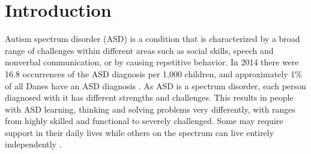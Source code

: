 \chapter{Introduction}
Autism spectrum disorder (ASD) is a condition that is characterized by a broad range of challenges within different areas such as social skills, speech and nonverbal communication, or by causing repetitive behavior.
In 2014 there were 16.8 occurrences of the ASD diagnosis per 1,000 children, and approximately 1\% of all Danes have an ASD diagnosis \autocite{cdcdata}. 
As ASD is a spectrum disorder, each person diagnosed with it has different strengths and challenges.
This results in people with ASD learning, thinking and solving problems very differently, with ranges from highly skilled and functional to severely challenged. 
Some may require support in their daily lives while others on the spectrum can live entirely independently \autocite{autismspeaks}.
